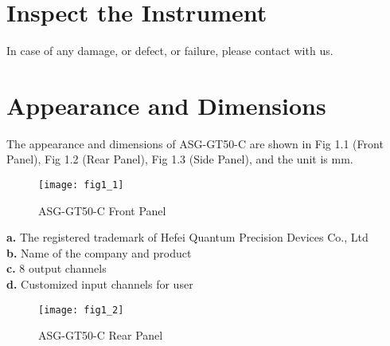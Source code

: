 \section{\heiti Inspect the Instrument}
\hspace{-0.2cm}In case of any damage, or defect, or failure, please contact with us.

\section{\heiti Appearance and Dimensions}
\hspace{-0.3cm}The appearance and dimensions of ASG-GT50-C are shown in Fig 1.1 (Front Panel), Fig 1.2 (Rear Panel), Fig 1.3 (Side Panel), and the unit is mm.
\begin{figure}[ht]
\centering
\texttt{[image: fig1\_1]}
\caption{\hspace{0.2cm}ASG-GT50-C Front Panel}\label{fig:fig1_1}
\end{figure}


\noindent \textbf{a.} The registered trademark of Hefei Quantum Precision Devices Co., Ltd\\
\textbf{b.} Name of the company and product \\
\textbf{c.} 8 output channels \\
\textbf{d.} Customized  input channels for user  


\begin{figure}[ht]
\centering
\texttt{[image: fig1\_2]}
\caption{\hspace{0.2cm}ASG-GT50-C Rear Panel}\label{fig:fig1_2}
\end{figure}

